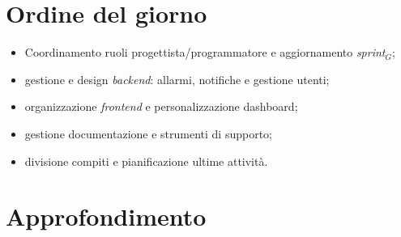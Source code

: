 \documentclass[10pt, letterpaper]{article}
\begin{document}
\makeTitlePage


\newpage

\tableofcontents

\newpage


\makeMeetingParticipantsTable




\makePrecedentTodoTable
\section{Ordine del giorno}
\begin{itemize}
    \item Coordinamento ruoli progettista/programmatore e aggiornamento \textit{sprint$_G$};
    \item gestione e design \textit{backend}: allarmi, notifiche e gestione utenti;
    \item organizzazione \textit{frontend} e personalizzazione dashboard;
    \item gestione documentazione e strumenti di supporto;
    \item divisione compiti e pianificazione ultime attività.
\end{itemize}

\section{Approfondimento}
\end{document}
